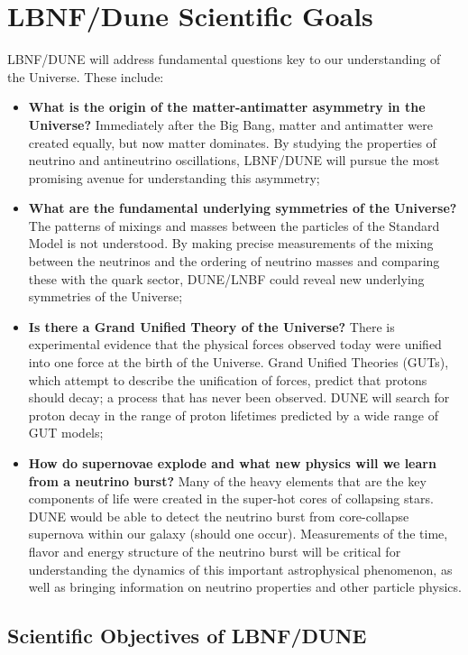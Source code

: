\chapter{LBNF/Dune Scientific Goals}
\label{ch:physics-goals}

LBNF/DUNE will address fundamental questions key to our understanding of the Universe. These include:
\begin{itemize}
   \item {\bf What is the origin of the matter-antimatter asymmetry in the Universe?} Immediately after
                    the Big Bang, matter and antimatter were created equally, but now matter dominates.
                    By studying the properties of neutrino and antineutrino oscillations, LBNF/DUNE 
                    will pursue the most promising avenue for understanding this asymmetry;
   \item {\bf What are the fundamental underlying symmetries of the Universe?} The patterns of mixings and masses between the particles of the Standard Model is not understood. By making precise measurements of the mixing between the neutrinos and the ordering of neutrino masses and comparing these with the quark sector, DUNE/LNBF could reveal new underlying symmetries of the Universe;
  \item{\bf  Is there a Grand Unified Theory of the Universe?} There is experimental evidence that the
                 physical forces observed today were unified into one force at the birth of the Universe.
                Grand Unified Theories (GUTs), which attempt to describe the unification of forces,
                predict that protons should decay; a process that has never been observed. DUNE will 
                search for proton decay in the range of proton lifetimes predicted by a wide range of GUT models;
   \item{\bf How do supernovae explode and what new physics will we learn from a neutrino burst?}
   Many of the heavy elements that are the key components of life were created in the super-hot cores of collapsing stars. DUNE would be able to detect the neutrino burst from core-collapse supernova within our galaxy (should one occur). Measurements of the time, flavor and energy structure of the neutrino burst will be critical for understanding the dynamics of this important astrophysical phenomenon, as well as bringing information on neutrino properties and other particle physics.
\end{itemize}

\section{Scientific Objectives of LBNF/DUNE}

